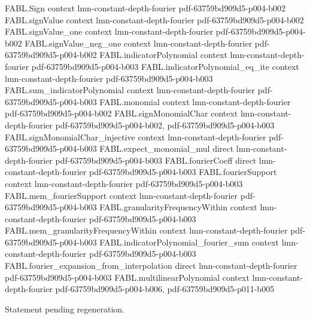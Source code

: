 \begin{theorem}
\label{FABL.fourier_expansion_unique}
\leanok
{}
\proofstep
  {FABL.Sign}
  {context}
  {lmn-constant-depth-fourier}
  {pdf-63759bd909d5-p004-b002}
\proofstep
  {FABL.signValue}
  {context}
  {lmn-constant-depth-fourier}
  {pdf-63759bd909d5-p004-b002}
\proofstep
  {FABL.signValue_one}
  {context}
  {lmn-constant-depth-fourier}
  {pdf-63759bd909d5-p004-b002}
\proofstep
  {FABL.signValue_neg_one}
  {context}
  {lmn-constant-depth-fourier}
  {pdf-63759bd909d5-p004-b002}
\proofstep
  {FABL.indicatorPolynomial}
  {context}
  {lmn-constant-depth-fourier}
  {pdf-63759bd909d5-p004-b003}
\proofstep
  {FABL.indicatorPolynomial_eq_ite}
  {context}
  {lmn-constant-depth-fourier}
  {pdf-63759bd909d5-p004-b003}
\proofstep
  {FABL.sum_indicatorPolynomial}
  {context}
  {lmn-constant-depth-fourier}
  {pdf-63759bd909d5-p004-b003}
\proofstep
  {FABL.monomial}
  {context}
  {lmn-constant-depth-fourier}
  {pdf-63759bd909d5-p004-b002}
\proofstep
  {FABL.signMonomialChar}
  {context}
  {lmn-constant-depth-fourier}
  {pdf-63759bd909d5-p004-b002,
    pdf-63759bd909d5-p004-b003}
\proofstep
  {FABL.signMonomialChar_injective}
  {context}
  {lmn-constant-depth-fourier}
  {pdf-63759bd909d5-p004-b003}
\proofstep
  {FABL.expect_monomial_mul}
  {direct}
  {lmn-constant-depth-fourier}
  {pdf-63759bd909d5-p004-b003}
\proofstep
  {FABL.fourierCoeff}
  {direct}
  {lmn-constant-depth-fourier}
  {pdf-63759bd909d5-p004-b003}
\proofstep
  {FABL.fourierSupport}
  {context}
  {lmn-constant-depth-fourier}
  {pdf-63759bd909d5-p004-b003}
\proofstep
  {FABL.mem_fourierSupport}
  {context}
  {lmn-constant-depth-fourier}
  {pdf-63759bd909d5-p004-b003}
\proofstep
  {FABL.granularityFrequencyWithin}
  {context}
  {lmn-constant-depth-fourier}
  {pdf-63759bd909d5-p004-b003}
\proofstep
  {FABL.mem_granularityFrequencyWithin}
  {context}
  {lmn-constant-depth-fourier}
  {pdf-63759bd909d5-p004-b003}
\proofstep
  {FABL.indicatorPolynomial_fourier_sum}
  {context}
  {lmn-constant-depth-fourier}
  {pdf-63759bd909d5-p004-b003}
\proofstep
  {FABL.fourier_expansion_from_interpolation}
  {direct}
  {lmn-constant-depth-fourier}
  {pdf-63759bd909d5-p004-b003}
\proofstep
  {FABL.multilinearPolynomial}
  {context}
  {lmn-constant-depth-fourier}
  {pdf-63759bd909d5-p004-b006,
    pdf-63759bd909d5-p011-b005}

Statement pending regeneration.
\end{theorem}

